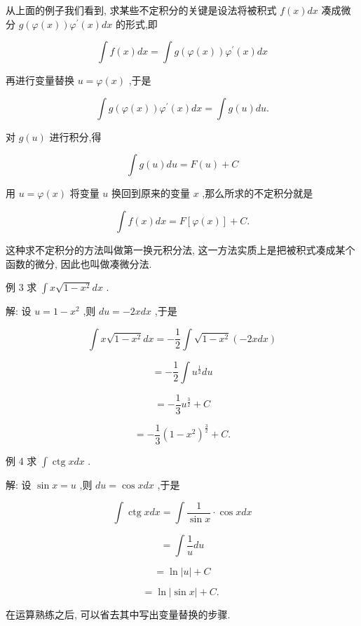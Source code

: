 \documentclass[lang=cn,newtx,12pt,scheme=chinese]{elegantbook}
\begin{document}
\begin{proposition}[第一换元积分法]

从上面的例子我们看到, 求某些不定积分的关键是设法将被积式 \(f\left( x\right) {dx}\) 凑成微分 \(g\left( {\varphi \left( x\right) }\right) {\varphi }^{\prime }\left( x\right) {dx}\) 的形式,即

\[
\int f\left( x\right) {dx} = \int g\left( {\varphi \left( x\right) }\right) {\varphi }^{\prime }\left( x\right) {dx}
\]

再进行变量替换 \(u = \varphi \left( x\right)\) ,于是

\[
\int g\left( {\varphi \left( x\right) }\right) {\varphi }^{\prime }\left( x\right) {dx} = \int g\left( u\right) {du}.
\]

对 \(g\left( u\right)\) 进行积分,得

\[
\int g\left( u\right) {du} = F\left( u\right) + C
\]

用 \(u = \varphi \left( x\right)\) 将变量 \(u\) 换回到原来的变量 \(x\) ,那么所求的不定积分就是

\[
\int f\left( x\right) {dx} = F\left\lbrack {\varphi \left( x\right) }\right\rbrack + C.
\]

这种求不定积分的方法叫做第一换元积分法, 这一方法实质上是把被积式凑成某个函数的微分, 因此也叫做凑微分法.

\end{proposition}

例 3 求 \(\int x\sqrt{1 - {x}^{2}}{dx}\) .

解: 设 \(u = 1 - {x}^{2}\) ,则 \({du} = - {2xdx}\) ,于是

\[
\int x\sqrt{1 - {x}^{2}}{dx} = - \frac{1}{2}\int \sqrt{1 - {x}^{2}}\left( {-{2xdx}}\right)
\]

\[
= - \frac{1}{2}\int {u}^{\frac{1}{2}}{du}
\]

\[
= - \frac{1}{3}{u}^{\frac{3}{2}} + C
\]

\[
= - \frac{1}{3}{\left( 1 - {x}^{2}\right) }^{\frac{3}{2}} + C\text{.}
\]

例 4 求 \(\int \operatorname{ctg}{xdx}\) .

解: 设 \(\sin x = u\) ,则 \({du} = \cos {xdx}\) ,于是

\[
\int \operatorname{ctg}{xdx} = \int \frac{1}{\sin x} \cdot \cos {xdx}
\]

\[
= \int \frac{1}{u}{du}
\]

\[
= \ln \left| u\right| + C
\]

\[
= \ln \left| {\sin x}\right| + C\text{. }
\]

在运算熟练之后, 可以省去其中写出变量替换的步骤.
\end{document}
